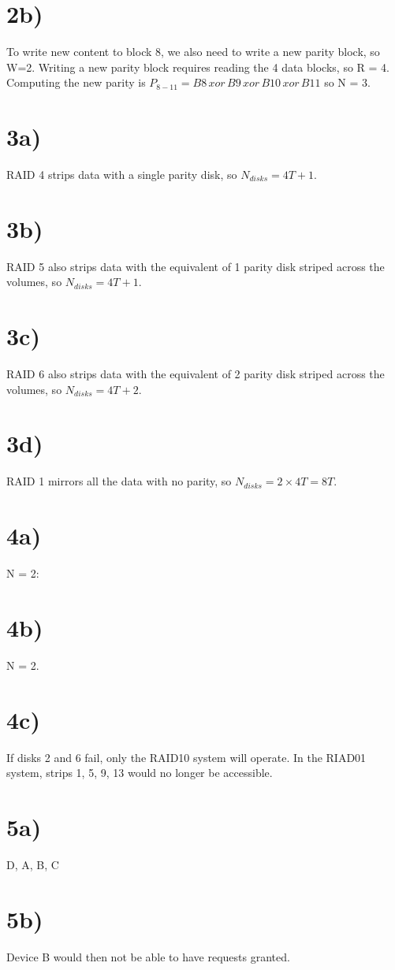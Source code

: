 \documentclass[a4paper,11pt]{article}
\begin{document}
\section*{2b)} 
To write new content to block 8, we also need to write a new parity block, so W=2.  Writing a new parity block requires reading the 4 data blocks, 
so R = 4.  Computing the new parity is $P_{8-11} = B8 \, xor  \, B9  \, xor  \, B10  \, xor  \, B11 $ so N = 3.


\section*{3a)}
RAID 4 strips data with a single parity disk, so $N_{disks} = 4T + 1$.

\section*{3b)}
RAID 5 also strips data with the equivalent of 1 parity disk striped across the volumes, so $N_{disks} = 4T + 1$.

\section*{3c)}
RAID 6 also strips data with the equivalent of 2 parity disk striped across the volumes, so $N_{disks} = 4T + 2$.

\section*{3d)}
RAID 1 mirrors all the data with no parity, so $N_{disks} = 2 \times 4T = 8T$.


\section*{4a)}
N = 2: 

\section*{4b)}
N = 2.

\section*{4c)}
If disks 2 and 6 fail, only the RAID10 system will operate.  In the RIAD01 system, strips 1, 5, 9, 13 would no longer
be accessible.


\section*{5a)}
D, A, B, C

\section*{5b)}
Device B would then not be able to have requests granted.

\end{document}
